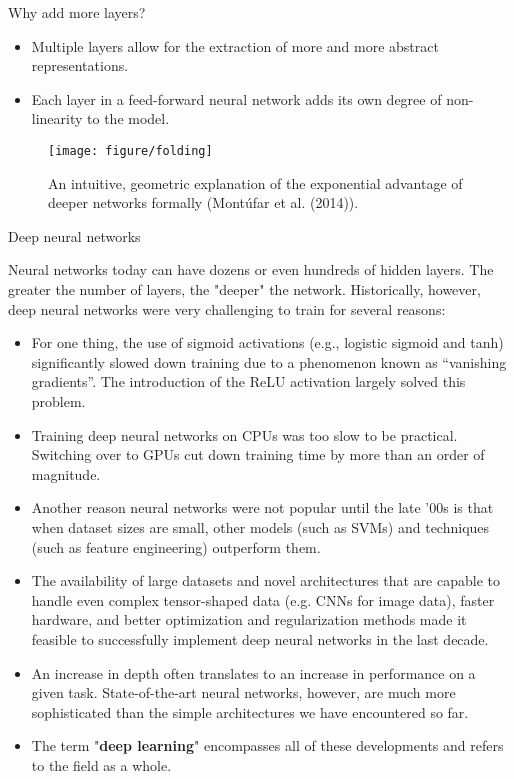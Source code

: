 \begin{vbframe}{Why add more layers?}
\begin{itemize}
\item Multiple layers allow for the extraction of more and more abstract
representations.
\lz
\item Each layer in a feed-forward neural network adds its own degree of non-linearity to the model.
\end{itemize}
\lz
\begin{figure}
\centering
\texttt{[image: figure/folding]}
\caption{An intuitive, geometric explanation of the exponential advantage of deeper networks formally (Mont\'{u}far et al. (2014)).}
\end{figure}
\end{vbframe}

\begin{vbframe}{Deep neural networks}

Neural networks today can have dozens or even hundreds of hidden layers. The greater the number of layers, the "deeper" the network. Historically, however, deep neural networks were very challenging to train for several reasons:
\lz
\begin{itemize}
\item For one thing, the use of sigmoid activations (e.g., logistic sigmoid and tanh) significantly slowed down training due to a phenomenon known as \enquote{vanishing gradients}. The introduction of the ReLU activation largely solved this problem.
\item Training deep neural networks on CPUs was too slow to be practical. Switching over to GPUs cut down training time by more than an order of magnitude.
\item Another reason neural networks were not popular until the late '00s is that when dataset sizes are small, other models (such as SVMs) and techniques (such as feature engineering) outperform them. 
\end{itemize}
\framebreak
\begin{itemize}
\item The availability of large datasets and novel architectures that are capable to handle even complex tensor-shaped data (e.g. CNNs for image data), faster hardware, and better optimization and regularization methods made it feasible to successfully implement deep neural networks in the last decade.
\lz

\item An increase in depth often translates to an increase in performance on a given task. State-of-the-art neural networks, however, are much more sophisticated than the simple architectures we have encountered so far.

\lz
\item The term "\textbf{deep learning}" encompasses all of these developments and refers to the field as a whole.
\end{itemize}
\end{vbframe}

\endlecture
